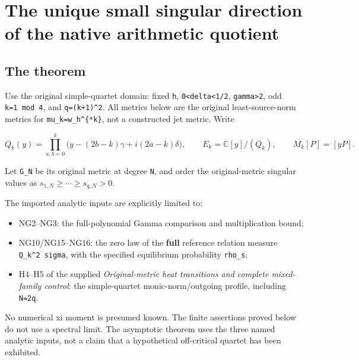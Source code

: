 \section{The unique small singular direction of the native arithmetic quotient}\label{the-unique-small-singular-direction-of-the-native-arithmetic-quotient}

\subsection{The theorem}\label{the-theorem}

Use the original simple-quartet domain: fixed \texttt{h}, \texttt{0\textless{}delta\textless{}1/2}, \texttt{gamma\textgreater{}2}, odd \texttt{k=1\ mod\ 4}, and \texttt{q=(k+1)\^{}2}. All metrics below are the original least-source-norm metrics for \texttt{mu\_k=w\_h\^{}\{*k\}}, not a constructed jet metric. Write

\[
 Q_k(y)=\prod_{a,b=0}^{k}\bigl(y-(2b-k)\gamma+i(2a-k)\delta\bigr),\qquad
 E_k=\mathbb C[y]/(Q_k),\qquad M_k[P]=[yP].
\]

Let \texttt{G\_N} be its original metric at degree \texttt{N}, and order the original-metric singular values as \(s_{1,N}\ge\cdots\ge s_{q,N}>0\).

The imported analytic inputs are explicitly limited to:

\begin{itemize}
\tightlist
\item
  NG2--NG3: the full-polynomial Gamma comparison and multiplication bound;
\item
  NG10/NG15--NG16: the zero law of the \textbf{full} reference relation measure \texttt{Q\_k\^{}2\ sigma}, with the specified equilibrium probability \texttt{rho\_s};
\item
  H4--H5 of the supplied \emph{Original-metric heat transitions and complete mixed-family control}: the simple-quartet monic-norm/outgoing profile, including \texttt{N=2q}.
\end{itemize}

No numerical xi moment is presumed known. The finite assertions proved below do not use a spectral limit. The asymptotic theorem uses the three named analytic inputs, not a claim that a hypothetical off-critical quartet has been exhibited.

